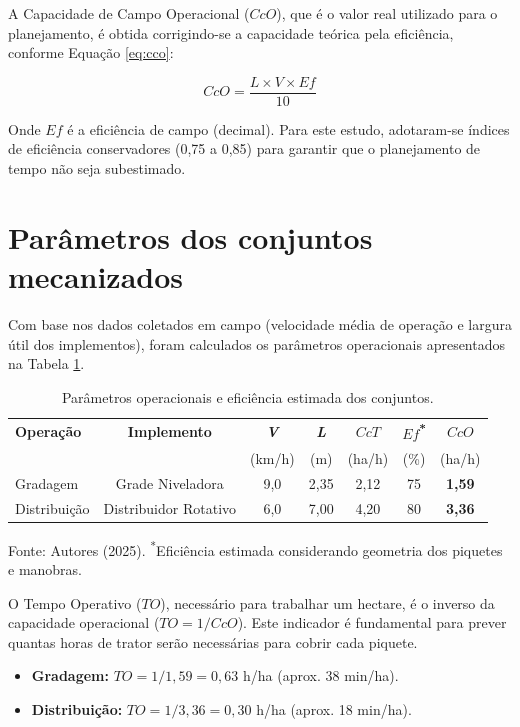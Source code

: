 \documentclass[12pt,openright,oneside,a4paper,hidelinks,espacamento=1.5]{abntex2}
\begin{document}
A Capacidade de Campo Operacional ($CcO$), que é o valor real utilizado para o planejamento, é obtida corrigindo-se a capacidade teórica pela eficiência, conforme Equação \ref{eq:cco}:

\begin{equation} \label{eq:cco}
    CcO = \frac{L \times V \times Ef}{10}
\end{equation}

\noindent Onde $Ef$ é a eficiência de campo (decimal). Para este estudo, adotaram-se índices de eficiência conservadores (0,75 a 0,85) para garantir que o planejamento de tempo não seja subestimado.

\section{Parâmetros dos conjuntos mecanizados}

Com base nos dados coletados em campo (velocidade média de operação e largura útil dos implementos), foram calculados os parâmetros operacionais apresentados na Tabela \ref{tab:parametros_maquinas}.

\begin{table}[H]
    \centering
    \caption{Parâmetros operacionais e eficiência estimada dos conjuntos.}
    \label{tab:parametros_maquinas}
    \vspace{0.1cm}
    \begin{tabular}{lcccccc}
        \toprule
        \textbf{Operação} & \textbf{Implemento} & \textbf{\textit{V}} & \textbf{\textit{L}} & \textbf{$CcT$} & \textbf{$Ef$\textsuperscript{*}} & \textbf{$CcO$} \\
         & & (km/h) & (m) & (ha/h) & (\%) & (ha/h) \\
        \midrule
        Gradagem & Grade Niveladora & 9,0 & 2,35 & 2,12 & 75 & \textbf{1,59} \\
        Distribuição & Distribuidor Rotativo & 6,0 & 7,00 & 4,20 & 80 & \textbf{3,36} \\
        \bottomrule
    \end{tabular}
    \begin{flushleft}\begin{footnotesize}
       Fonte: Autores (2025). \textsuperscript{*}Eficiência estimada considerando geometria dos piquetes e manobras.
    \end{footnotesize}\end{flushleft}
\end{table}

O Tempo Operativo ($TO$), necessário para trabalhar um hectare, é o inverso da capacidade operacional ($TO = 1/CcO$). Este indicador é fundamental para prever quantas horas de trator serão necessárias para cobrir cada piquete.
\begin{itemize}
    \item \textbf{Gradagem:} $TO = 1 / 1,59 = 0,63$ h/ha (aprox. 38 min/ha).
    \item \textbf{Distribuição:} $TO = 1 / 3,36 = 0,30$ h/ha (aprox. 18 min/ha).
\end{itemize}
\end{document}
